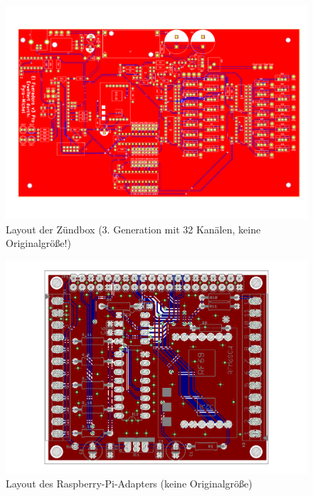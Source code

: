 \documentclass[paper=a4, parskip, numbers=noenddot, toc=listof, headsepline]{scrbook}
\begin{document}
		\begin{figure}
			\centering
			\includegraphics[angle=90, height=.97\textheight,keepaspectratio]{Bilder/Zuendboxlayout332}
			\caption{Layout der Zündbox (3. Generation mit 32 Kanälen, keine Originalgröße!)}
			\label{fig:zuendbox332layout}
		\end{figure}	
		\begin{figure}
			\centering
			\includegraphics[angle=-90,width=.95\textwidth,keepaspectratio]{Bilder/Piadapterlayout}
			\caption{Layout des Raspberry-Pi-Adapters (keine Originalgröße)}
			\label{fig:piadapterlayout}
		\end{figure}

		\begin{refsection}
			\newrefcontext[sorting=nty]
			\nocite{*} %
			\printbibliography[title=Datenblätter, heading=bibnumbered]
			\label{sec:datasheets}
		\end{refsection}
\end{document}
